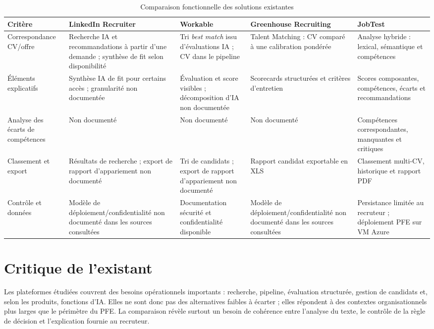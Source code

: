 \begin{table}[htbp]
\centering
\scriptsize
\setlength{\tabcolsep}{3pt}
\renewcommand{\arraystretch}{1.28}
\begin{tabularx}{\textwidth}{|p{}|X|X|X|X|}
\hline
\textbf{Critère} & \textbf{LinkedIn Recruiter} & \textbf{Workable} & \textbf{Greenhouse Recruiting} & \textbf{JobTest}\\
\hline
Correspondance CV/offre & Recherche IA et recommandations à partir d'une demande ; synthèse de fit selon disponibilité & Tri \emph{best match} issu d'évaluations IA ; CV dans le pipeline & Talent Matching : CV comparé à une calibration pondérée & Analyse hybride : lexical, sémantique et compétences\\
\hline
Éléments explicatifs & Synthèse IA de fit pour certains accès ; granularité non documentée & Évaluation et score visibles ; décomposition d'IA non documentée & Scorecards structurées et critères d'entretien & Scores composantes, compétences, écarts et recommandations\\
\hline
Analyse des écarts de compétences & Non documenté & Non documenté & Non documenté & Compétences correspondantes, manquantes et critiques\\
\hline
Classement et export & Résultats de recherche ; export de rapport d'appariement non documenté & Tri de candidats ; export de rapport d'appariement non documenté & Rapport candidat exportable en XLS & Classement multi-CV, historique et rapport PDF\\
\hline
Contrôle et données & Modèle de déploiement/confidentialité non documenté dans les sources consultées & Documentation sécurité et confidentialité disponible & Modèle de déploiement/confidentialité non documenté dans les sources consultées & Persistance limitée au recruteur ; déploiement PFE sur VM Azure\\
\hline
\end{tabularx}
\caption[Comparaison fonctionnelle des solutions existantes]{Comparaison fonctionnelle des solutions existantes \cite{linkedin_recruiter_ai,workable_pipeline,workable_security,greenhouse_ai,greenhouse_scorecards,greenhouse_reports}}
\label{tab:comparatif-existant}
\end{table}

\section{Critique de l'existant}
Les plateformes étudiées couvrent des besoins opérationnels importants : recherche, pipeline, évaluation structurée, gestion de candidats et, selon les produits, fonctions d'IA. Elles ne sont donc pas des alternatives faibles à écarter ; elles répondent à des contextes organisationnels plus larges que le périmètre du PFE. La comparaison révèle surtout un besoin de cohérence entre l'analyse du texte, le contrôle de la règle de décision et l'explication fournie au recruteur.

